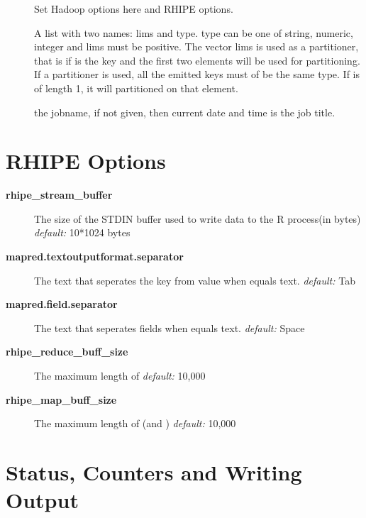 \documentclass[letterpaper,10pt,english]{sphinxmanual}
\begin{document}
\begin{description}
\item[{}] \leavevmode
Set Hadoop options here and RHIPE options.

\item[{}] \leavevmode
A list with two names: lims and type. type can be one of string, numeric, integer and lims must be positive. The vector lims is used as a partitioner, that is if  is the key and  the first two elements will be used for partitioning. If a partitioner is used, all the emitted keys must of be the same type. If  is of length 1, it will partitioned on that element.

\item[{}] \leavevmode
the jobname, if not given, then current date and time is the job title.

\end{description}


\section{RHIPE Options}
\label{rhmr:rhipe-options}\begin{description}
\item[{\textbf{rhipe\_stream\_buffer}}] \leavevmode
The size of the STDIN buffer used to write data to the R process(in bytes)
\emph{default:} 10*1024 bytes

\item[{\textbf{mapred.textoutputformat.separator}}] \leavevmode
The text that seperates the key from value when  equals text.
\emph{default:} Tab

\item[{\textbf{mapred.field.separator}}] \leavevmode
The text that seperates fields when  equals text.
\emph{default:} Space

\item[{\textbf{rhipe\_reduce\_buff\_size}}] \leavevmode
The maximum length of 
\emph{default:} 10,000

\item[{\textbf{rhipe\_map\_buff\_size}}] \leavevmode
The maximum length of  (and )
\emph{default:} 10,000

\end{description}


\section{Status, Counters and Writing Output}
\label{rhmr:status-counters-and-writing-output}
\end{document}

